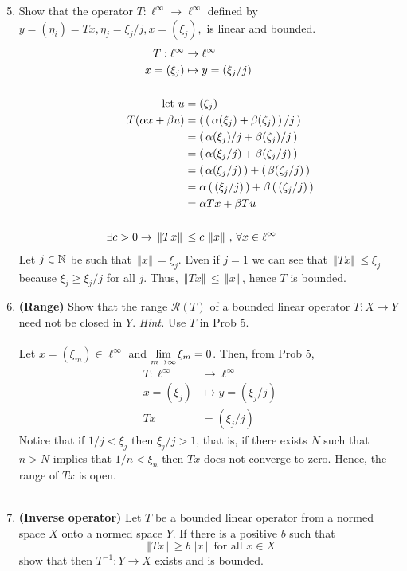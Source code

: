 \documentclass[10pt,a4paper]{report}
\newcommand{\NORM}[1]{\,\left \Vert #1 \right \Vert\,}
\begin{document}
\begin{enumerate}
	\setcounter{enumi}{4}
	\item Show that the operator $T: \ell^\infty \to \ell^\infty$ defined by $y = (\eta_i)=Tx, \eta_j=\xi_j/j, x=(\xi_j),$ is linear and bounded.\\
	\begin{align*}
		T : \ell^\infty &\to \ell^\infty \\
		x=(\xi_j) &\mapsto y = (\xi_j/j)\\
		\\
		\text{let } u&= (\zeta_j)\\
		T(\alpha x + \beta u) &= \PAREN{ \PAREN{\alpha (\xi_j)+ \beta (\zeta_j)}/j } \\
		&= \PAREN{ \alpha (\xi_j)/j+ \beta (\zeta_j)/j } \\
		&= \PAREN{ \alpha (\xi_j/j)+ \beta (\zeta_j/j) } \\
		&= \PAREN{ \alpha (\xi_j/j) }+ \PAREN{\beta (\zeta_j/j) } \\
		&= \alpha \PAREN{ (\xi_j/j) }+ \beta\PAREN{ (\zeta_j/j) } \\
		&= \alpha Tx + \beta Tu \\
		\\
		\exists c>0 \to \NORM{Tx} &\le c \NORM{x}, \, \forall x\in \ell^\infty
	\end{align*}Let $j\in \mathbb{N}$ be such that $\NORM{x} = \xi_j$.  Even if $j=1$ we can see that $\NORM{Tx} \le \xi_j$ because $\xi_j \ge \xi_j/j$ for all $j$.  Thus, $\NORM{Tx} \le \NORM{x}$, hence $T$ is bounded.
	\item \textbf{(Range)} Show that the range $\mathcal{R}(T)$ of a bounded linear operator $T: X\to Y$ need not be closed in $Y$.  \textit{Hint.} Use $T$ in Prob 5.\\
	\\
	Let $x=(\xi_m) \in \ell^\infty$ and $\underset{m\to \infty}\lim\, \xi_m = 0$.  Then, from Prob 5, 
	\begin{align*}
		T : \ell^\infty &\to \ell^\infty \\
		x=(\xi_j) &\mapsto y = (\xi_j/j)\\
		Tx &= (\xi_j/j)
	\end{align*}Notice that if $1/j< \xi_j$ then $\xi_j/j > 1$, that is, if there exists $N$ such that $n>N$ implies that $1/n < \xi_n$ then $Tx$ does not converge to zero.  Hence, the range of $Tx$ is open.\\
	\\
	\item \textbf{(Inverse operator)} Let $T$ be a bounded linear operator from a normed space $X$ onto a normed space $Y$.  If there is a positive $b$ such that $$ \NORM{Tx}\ge b\NORM{x} \text{ for all } x \in X$$ show that then $T^{-1}:Y\to X$ exists and is bounded.\\
	

\end{enumerate}
\end{document}
